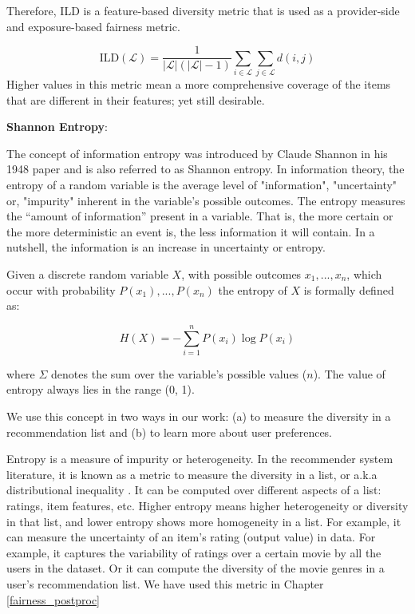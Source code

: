         Therefore, ILD is a feature-based diversity metric that is used as a provider-side and exposure-based fairness metric.
        
        
        \begin{equation}
            \text{ILD}(\mathcal{L}) = \frac{1} {|\mathcal{L}|(|\mathcal{L}|-1)} \sum_{i \in \mathcal{L}}\sum_{j \in \mathcal{L}}d(i,j)
        \end{equation}
        Higher values in this metric mean a more comprehensive coverage of the items that are different in their features; yet still desirable.




        \textbf{Shannon Entropy}:
        
        The concept of information entropy was introduced by Claude Shannon in his 1948 paper \cite{entropy1948} and is also referred to as Shannon entropy. In information theory, the entropy of a random variable is the average level of "information", "uncertainty" or, "impurity" inherent in the variable's possible outcomes. The entropy measures the “amount of information” present in a variable. That is, the more certain or the more deterministic an event is, the less information it will contain. In a nutshell, the information is an increase in uncertainty or entropy. 
        
        Given a discrete random variable $X$, with possible outcomes $x_{1},...,x_{n}$, which occur with probability $P(x_1),...,P(x_n)$
         the entropy of $X$ is formally defined as:
         
         \begin{equation}
            H(X)=-\sum_{i=1}^{n}P(x_{i})\log P(x_{i})
         \end{equation}

        where $\Sigma$ denotes the sum over the variable's possible values ($n$). The value of entropy always lies in the range (0, 1).
        
        We use this concept in two ways in our work: (a) to measure the diversity in a recommendation list and (b) to learn more about user preferences.
        
        Entropy is a measure of impurity or heterogeneity. In the recommender system literature, it is known as a metric to measure the diversity in a list, or a.k.a distributional inequality . It can be computed over different aspects of a list: ratings, item features, etc.
        Higher entropy means higher heterogeneity or diversity in that list, and lower entropy shows more homogeneity in a list. For example, it can measure the uncertainty of an item’s rating (output value) in data. For example, it captures the variability of ratings over a certain movie by all the users in the dataset. Or it can compute the diversity of the movie genres in a user's recommendation list. We have used this metric in Chapter \ref{fairness_postproc} 
        
